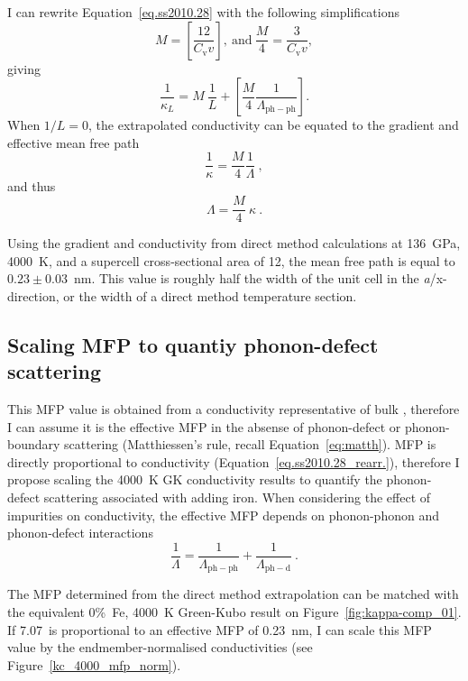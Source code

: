 I can rewrite Equation~\ref{eq.ss2010.28} with the following simplifications 
%
$$M = \left [ \frac{12}{C_{\mathrm{v}}v} \right ],\ \mathrm{and}\ \frac{M}{4}= \frac{3}{C_{\mathrm{v}}v},$$
%
giving
%
\begin{equation} 
\frac{1}{\kappa_{L}}= M\ \frac{1}{L}+\left [ \frac{M}{4} \frac{1}{\Lambda_{\mathrm{ph-ph}}} \right ]. 
\label{eq.ss2010.28_simp}
\end{equation}
%
When $1/L = 0$, the extrapolated conductivity can be equated to the gradient and effective mean free path
%
$$ \frac{1}{\kappa}=  \frac{M}{4} \frac{1}{\Lambda}\ ,$$
%
and thus 
%
\begin{equation}
\Lambda = \frac{M}{4}\ \kappa \ .
\label{eq.ss2010.28_rearr.}
\end{equation}

Using the gradient and conductivity from direct method calculations at 136~GPa, 4000~K, and a supercell cross-sectional area of 12, the mean free path is equal to $0.23\pm0.03$~nm. This value is roughly half the width of the unit cell in the \textit{a}/x-direction, or the width of a direct method temperature section.



\subsection{Scaling MFP to quantiy phonon-defect scattering}

This MFP value is obtained from a conductivity representative of bulk \mgsios \bdg, therefore I can assume it is the effective MFP in the absense of phonon-defect or phonon-boundary scattering (Matthiessen's rule, recall Equation~\ref{eq:matth}). MFP is directly proportional to conductivity (Equation~\ref{eq.ss2010.28_rearr.}), therefore I propose scaling the 4000~K GK conductivity results to quantify the phonon-defect scattering associated with adding iron. When considering the effect of impurities on conductivity, the effective MFP depends on phonon-phonon and phonon-defect interactions
%
\begin{equation}
\frac{1}{\Lambda}=\frac{1}{\Lambda_{\mathrm{ph-ph}}}+\frac{1}{\Lambda_{\mathrm{ph-d}}}\ .
\label{eq:matth_mfp_mod}
\end{equation}

The MFP determined from the direct method extrapolation can be matched with the equivalent 0\%~Fe, 4000~K Green-Kubo result on Figure~\ref{fig:kappa-comp_01}. If 7.07~\wmks is proportional to an effective MFP of 0.23~nm, I can scale this MFP value by the \mgsios endmember-normalised conductivities (see Figure~\ref{kc_4000_mfp_norm}). 

